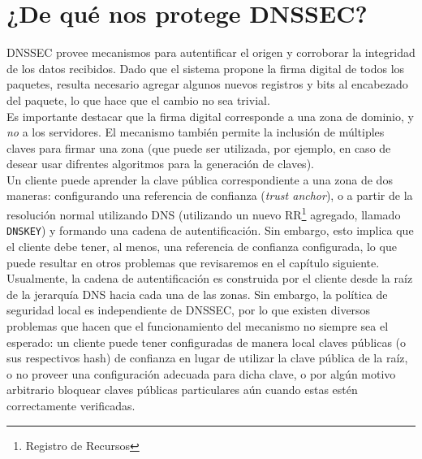 \chapter{¿De qu\'e nos protege DNSSEC?}
DNSSEC provee mecanismos para autentificar el origen y corroborar la integridad de los datos recibidos. Dado que el sistema propone la firma digital de todos los paquetes, resulta necesario agregar algunos nuevos registros y bits al encabezado del paquete, lo que hace que el cambio no sea trivial.\\
Es importante destacar que la firma digital corresponde a una zona de dominio, y \textit{no} a los servidores. El mecanismo tambi\'en permite la inclusi\'on de m\'ultiples claves para firmar una zona (que puede ser utilizada, por ejemplo, en caso de desear usar difrentes algoritmos para la generaci\'on de claves).\\
Un cliente puede aprender la clave p\'ublica correspondiente a una zona de dos maneras: configurando una referencia de confianza (\textit{trust anchor}), o a partir de la resoluci\'on normal utilizando DNS (utilizando un nuevo RR\footnote{Registro de Recursos} agregado, llamado \texttt{DNSKEY}) y formando una cadena de autentificaci\'on. Sin embargo, esto implica que el cliente debe tener, al menos, una referencia de confianza configurada, lo que puede resultar en otros problemas que revisaremos en el cap\'itulo siguiente.\\
Usualmente, la cadena de autentificaci\'on es construida por el cliente desde la ra\'iz de la jerarqu\'ia DNS hacia cada una de las zonas. Sin embargo, la pol\'itica de seguridad local es independiente de DNSSEC, por lo que existen diversos problemas que hacen que el funcionamiento del mecanismo no siempre sea el esperado: un cliente puede tener configuradas de manera local claves p\'ublicas (o sus respectivos hash) de confianza en lugar de utilizar la clave p\'ublica de la ra\'iz, o no proveer una configuraci\'on adecuada para dicha clave, o por alg\'un motivo arbitrario bloquear claves p\'ublicas particulares a\'un cuando estas est\'en correctamente verificadas.